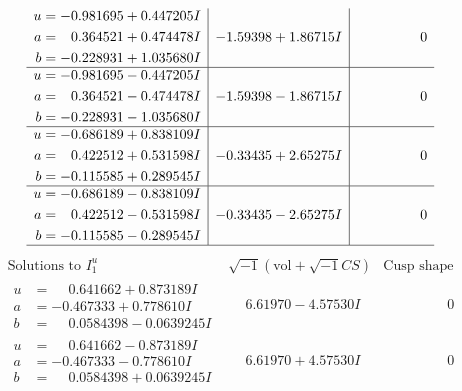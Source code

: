 \documentclass[1p]{elsarticle_modified}
\theoremstyle{definition}
\newcommand{\I}{\sqrt{-1}}
\begin{document}
$$\begin{array}{c|c|c}
\begin{aligned}
u &= -0.981695 + 0.447205 I \\
a &= \phantom{-}0.364521 + 0.474478 I \\
b &= -0.228931 + 1.035680 I\end{aligned}
 & -1.59398 + 1.86715 I & \phantom{-0.000000 } 0 \\ \hline\begin{aligned}
u &= -0.981695 - 0.447205 I \\
a &= \phantom{-}0.364521 - 0.474478 I \\
b &= -0.228931 - 1.035680 I\end{aligned}
 & -1.59398 - 1.86715 I & \phantom{-0.000000 } 0 \\ \hline\begin{aligned}
u &= -0.686189 + 0.838109 I \\
a &= \phantom{-}0.422512 + 0.531598 I \\
b &= -0.115585 + 0.289545 I\end{aligned}
 & -0.33435 + 2.65275 I & \phantom{-0.000000 } 0 \\ \hline\begin{aligned}
u &= -0.686189 - 0.838109 I \\
a &= \phantom{-}0.422512 - 0.531598 I \\
b &= -0.115585 - 0.289545 I\end{aligned}
 & -0.33435 - 2.65275 I & \phantom{-0.000000 } 0\\
 \hline 
 \end{array}$$\newpage$$\begin{array}{c|c|c}  
\text{Solutions to }I^u_{1}& \I (\text{vol} + \sqrt{-1}CS) & \text{Cusp shape}\\
 \hline 
\begin{aligned}
u &= \phantom{-}0.641662 + 0.873189 I \\
a &= -0.467333 + 0.778610 I \\
b &= \phantom{-}0.0584398 - 0.0639245 I\end{aligned}
 & \phantom{-}6.61970 - 4.57530 I & \phantom{-0.000000 } 0 \\ \hline\begin{aligned}
u &= \phantom{-}0.641662 - 0.873189 I \\
a &= -0.467333 - 0.778610 I \\
b &= \phantom{-}0.0584398 + 0.0639245 I\end{aligned}
 & \phantom{-}6.61970 + 4.57530 I & \phantom{-0.000000 } 0 \\ \hline\begin{aligned}

\end{aligned}
\end{array}$$
\end{document}
